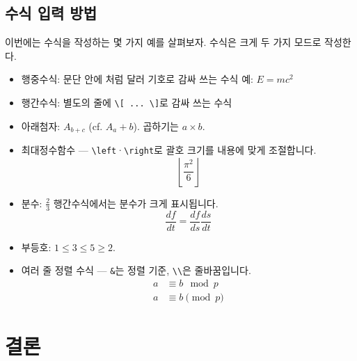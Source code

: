\subsection{수식 입력 방법}

이번에는 수식을 작성하는 몇 가지 예를 살펴보자. 수식은 크게 두 가지 모드로 작성한다.
\begin{itemize}
  \item 행중수식: 문단 안에 $처럼$ 달러 기호로 감싸 쓰는 수식 \quad 예: $E = mc^2$
  \item 행간수식: 별도의 줄에 \verb|\[ ... \]|로 감싸 쓰는 수식
\end{itemize}

\begin{itemize}
  \item 아래첨자: $A_{b+c}$ (cf. $A_a+b$). 곱하기는 $a\times b$.

  \item 최대정수함수 — \verb|\left|·\verb|\right|로 괄호 크기를 내용에 맞게 조절합니다.
    \[ \left\lfloor \frac{\pi^2}{6}\right\rfloor \]

  \item 분수: $\frac{2}{3}$ \quad 행간수식에서는 분수가 크게 표시됩니다.
    \[ \frac{df}{dt}=\frac{df}{ds}\frac{ds}{dt} \]

  \item 부등호: $1\leq 3\leq 5 \geq 2$.

  \item 여러 줄 정렬 수식 — \verb|&|는 정렬 기준, \verb|\\|은 줄바꿈입니다.
    \begin{align*}
      a & \equiv b \mod{p} \\
      a & \equiv b \pmod{p}
    \end{align*}
\end{itemize}


\section{결론}

\jiwon[4]
